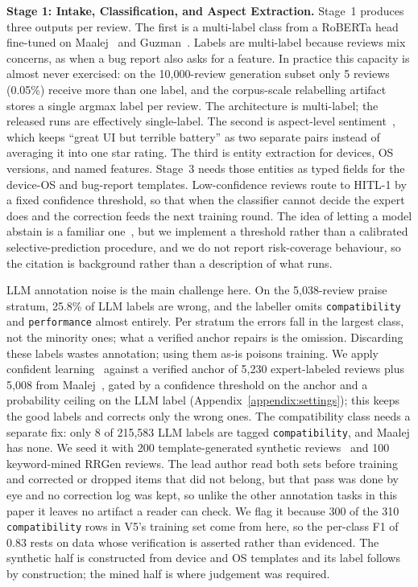 \documentclass[sigconf, anonymous]{acmart}
\begin{document}
\textbf{Stage 1: Intake, Classification, and Aspect Extraction.}
  Stage~1 produces three outputs per review. The first is a multi-label class from a RoBERTa
  head fine-tuned on Maalej~\cite{maalej2015bug} and Guzman~\cite{guzman2014users}. Labels are
  multi-label because reviews mix concerns, as when a bug report also asks for a feature. In
  practice this capacity is almost never exercised: on the 10{,}000-review generation subset only
  5 reviews (0.05\%) receive more than one label, and the corpus-scale relabelling artifact stores
  a single argmax label per review. The architecture is multi-label; the released runs are
  effectively single-label. The
  second is aspect-level sentiment~\cite{guzman2014users}, which keeps ``great UI but terrible
  battery'' as two separate pairs instead of averaging it into one star rating. The third is
  entity extraction for devices, OS versions, and named features. Stage~3 needs those entities
  as typed fields for the device-OS and bug-report templates.
  Low-confidence reviews route to HITL-1 by a fixed confidence threshold, so that when the
  classifier cannot decide the expert does and the correction feeds the next training round. The
  idea of letting a model abstain is a familiar one~\cite{geifman2017selective}, but we implement
  a threshold rather than a calibrated selective-prediction procedure, and we do not report
  risk-coverage behaviour, so the citation is background rather than a description of what runs.

  LLM annotation noise is the main challenge here. On the
  5{,}038-review praise stratum, 25.8\% of LLM labels are wrong,
  and the labeller omits \texttt{compatibility} and \texttt{performance} almost entirely. Per
  stratum the errors fall in the largest class, not the minority ones; what a verified anchor
  repairs is the omission. Discarding these labels wastes annotation;
  using them as-is poisons training. We apply confident
  learning~\cite{northcutt2021confident} against a verified anchor of
  5{,}230 expert-labeled reviews plus 5{,}008 from
  Maalej~\cite{maalej2015bug}, gated by a confidence threshold on the anchor and a probability
  ceiling on the LLM label (Appendix~\ref{appendix:settings}); this keeps the good labels and
  corrects only the wrong ones. The compatibility class needs a separate fix:
  only 8 of 215{,}583 LLM labels are tagged \texttt{compatibility}, and
  Maalej has none. We seed it with 200 template-generated synthetic
  reviews~\cite{joorabchi2013real} and 100 keyword-mined RRGen reviews. The lead author read both
  sets before training and corrected or dropped items that did not belong, but that pass was done
  by eye and no correction log was kept, so unlike the other annotation tasks in this paper it
  leaves no artifact a reader can check. We flag it because 300 of the 310 \texttt{compatibility}
  rows in V5's training set come from here, so the per-class F1 of 0.83 rests on data whose
  verification is asserted rather than evidenced. The synthetic half is constructed from device
  and OS templates and its label follows by construction; the mined half is where judgement was
  required.
  
\end{document}
